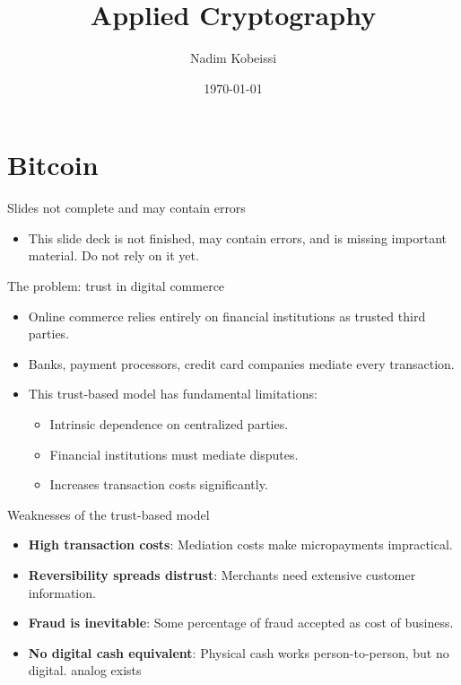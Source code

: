 \documentclass[aspectratio=169, lualatex, handout]{beamer}
\title{Applied Cryptography}
\author{Nadim Kobeissi}
\institute{American University of Beirut}
\date{\today}
\begin{document}
\begin{frame}[plain]
	\titlepage
\end{frame}

\section{Bitcoin}

\begin{frame}{Slides not complete and may contain errors}
	\begin{itemize}
		\item This slide deck is not finished, may contain errors, and is missing important material. Do not rely on it yet.
	\end{itemize}
\end{frame}

\begin{frame}{The problem: trust in digital commerce}
	\begin{itemize}
		\item Online commerce relies entirely on financial institutions as trusted third parties.
		\item Banks, payment processors, credit card companies mediate every transaction.
		\item This trust-based model has fundamental limitations:
		      \begin{itemize}
			      \item Intrinsic dependence on centralized parties.
			      \item Financial institutions must mediate disputes.
			      \item Increases transaction costs significantly.
		      \end{itemize}
	\end{itemize}
\end{frame}

\begin{frame}{Weaknesses of the trust-based model}
	\begin{itemize}
		\item \textbf{High transaction costs}: Mediation costs make micropayments impractical.
		\item \textbf{Reversibility spreads distrust}: Merchants need extensive customer information.
		\item \textbf{Fraud is inevitable}: Some percentage of fraud accepted as cost of business.
		\item \textbf{No digital cash equivalent}: Physical cash works person-to-person, but no digital. analog exists
	\end{itemize}
\end{frame}
\end{document}

